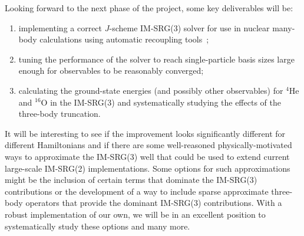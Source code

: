 Looking forward to the next phase of the project,
some key deliverables will be:
\begin{enumerate}
  \item{
    implementing a correct $J$-scheme IM-SRG(3) solver
    for use in nuclear many-body calculations
    using automatic recoupling tools~\cite{Tich20jcoupling};
  }
  \item tuning the performance of the solver to reach single-particle basis sizes large enough
    for observables to be reasonably converged;
  \item calculating the ground-state energies (and possibly other observables) for ${}^4\text{He}$
    and ${}^{16}\text{O}$ in the IM-SRG(3) and systematically studying the effects of the three-body truncation.
\end{enumerate}
It will be interesting to see if the improvement looks significantly different for different Hamiltonians
and if there are some well-reasoned physically-motivated ways to approximate the IM-SRG(3) well
that could be used to extend current large-scale IM-SRG(2) implementations.
Some options for such approximations might be
the inclusion of certain terms that dominate the IM-SRG(3) contributions
or the development of a way to include sparse approximate three-body operators
that provide the dominant IM-SRG(3) contributions.
With a robust implementation of our own,
we will be in an excellent position to systematically study these options and many more.

